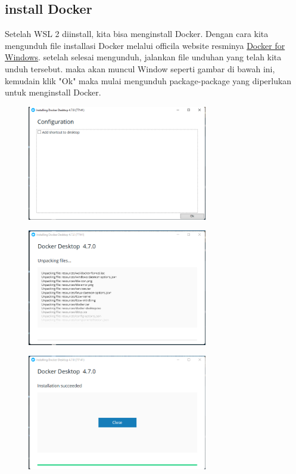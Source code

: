\documentclass[11pt,a4paper]{article}
\begin{document}
\subsection{install Docker}
Setelah WSL 2 diinstall, kita bisa menginstall Docker. Dengan cara kita mengunduh file installasi Docker melalui officila website resminya
\href{https://docs.docker.com/desktop/windows/install/}{Docker for Windows}. setelah selesai mengunduh, jalankan file
unduhan yang telah kita unduh tersebut. maka akan muncul Window seperti gambar di bawah ini, kemudain klik "Ok" maka mulai mengunduh
package-package yang diperlukan untuk menginstall Docker.
\begin{figure}[h]
\centering
\includegraphics[width=0.7\textwidth]{Figure/asset/1.png}
\end{figure}

\begin{subfigure}[t]
\centering
\includegraphics[width=0.7\textwidth]{Figure/asset/2.png}
\end{subfigure}

\begin{subfigure}[h]
	\centering
	\includegraphics[width=0.7\textwidth]{Figure/asset/3.png}
\end{subfigure}
\end{document}
